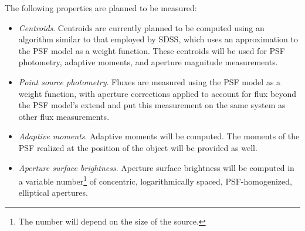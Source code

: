 The following \Source properties are planned to be measured:
%
\begin{itemize}
    \item \emph{Centroids}. Centroids are currently planned to be computed using an algorithm similar to that employed by SDSS, which uses an approximation to the PSF model as a weight function. These centroids will be used for PSF photometry, adaptive moments, and aperture magnitude measurements. 

    \item \emph{Point source photometry}. Fluxes are measured using the PSF model as a weight function, with aperture corrections applied to account for flux beyond the PSF model's extend and put this measurement on the same system as other flux measurements.

    \item \emph{Adaptive moments}. Adaptive moments will be computed. The moments of the PSF realized at the position of the object will be provided as well. 


    \item \emph{Aperture surface brightness}. Aperture surface brightness will be computed in a variable number\footnote{The number will depend on the size of the source.} of concentric, logarithmically spaced, PSF-homogenized, elliptical apertures. 


\end{itemize}

